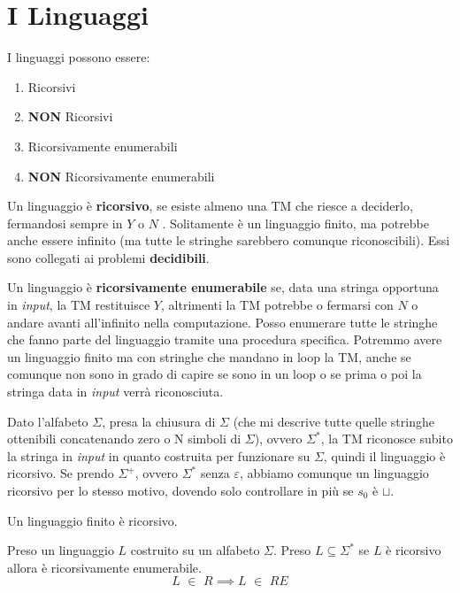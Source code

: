 \section{I Linguaggi}
I linguaggi possono essere:
\begin{enumerate}
    \item Ricorsivi
    \item \textbf{NON} Ricorsivi
    \item Ricorsivamente enumerabili
    \item \textbf{NON} Ricorsivamente enumerabili
\end{enumerate} 
\begin{definizione}
  Un linguaggio è \textbf{ricorsivo}, se esiste
  almeno una TM che riesce a deciderlo, fermandosi sempre in $Y$ o
  $N$ . Solitamente è un linguaggio finito, ma potrebbe anche essere infinito (ma
  tutte le stringhe sarebbero comunque riconoscibili). Essi sono collegati ai problemi \textbf{decidibili}.
\end{definizione}
 \begin{definizione}
   Un linguaggio è \textbf{ricorsivamente enumerabile} se, data una stringa opportuna in
  \textit{input}, la TM restituisce $Y$, altrimenti la TM potrebbe o fermarsi con $N$ o andare
  avanti all'infinito nella computazione. Posso enumerare tutte le stringhe che
  fanno parte del linguaggio tramite una procedura specifica.  Potremmo avere
  un linguaggio finito ma con 
  stringhe che mandano in loop la TM, anche se comunque non sono in grado di
  capire se sono in un loop o se prima o poi la stringa data in \textit{input} verrà
  riconosciuta.
 \end{definizione}
Dato l'alfabeto $\Sigma$, presa la chiusura
di $\Sigma$ (che mi descrive tutte quelle stringhe ottenibili concatenando zero o N simboli di $\Sigma$), ovvero $\Sigma^*$,
la TM riconosce subito la stringa in \textit{input} in quanto costruita per funzionare
su $\Sigma$, quindi il linguaggio è ricorsivo. Se prendo $\Sigma^+$, ovvero
$\Sigma^*$ senza $\varepsilon$, abbiamo comunque un linguaggio ricorsivo per lo
stesso motivo, dovendo solo controllare in più se $s_0$ è $\sqcup$.\\
 \begin{nota}
 Un linguaggio finito è ricorsivo.
 \end{nota} 
 \begin{definizione}
  Preso un linguaggio $L$ costruito su un alfabeto $\Sigma$. Preso $L\subseteq\Sigma^*$ se $L$ è ricorsivo allora è ricorsivamente
  enumerabile.
\[L\,\,\in\,\,R \implies L\,\,\in\,\,RE\]
\end{definizione}
